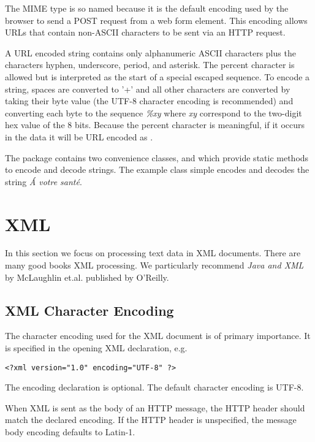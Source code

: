 The MIME type 
is so named because it is the default encoding used by the browser
to send a POST request from a web form element.
This encoding allows URLs that contain non-ASCII characters to be sent via an HTTP request.

A URL encoded string contains only alphanumeric ASCII characters plus the characters
hyphen, underscore, period, and asterisk. 
The percent character is allowed 
but is interpreted as the start of a special escaped sequence.
To encode a string, spaces are converted to '+' and
all other characters are converted by taking their byte value
(the UTF-8 character encoding is recommended)
and converting each byte to the sequence \emph{\%xy} where \emph{xy} correspond to the
two-digit hex value of the 8 bits.
Because the percent character is meaningful,
if it occurs in the data it will be URL encoded as .

The  package contains two convenience classes, 
and  which provide static methods to encode and decode strings.
The example class  simple encodes and decodes the string
\emph{\'{A} votre sant\'{e}}.
%
%
%



\section{XML}

In this section we focus on processing text data in XML documents.
There are many good books XML processing.
We particularly recommend \emph{Java and XML} by McLaughlin et.al.
published by O'Reilly.

\subsection{XML Character Encoding}

The character encoding used for the XML document is of primary importance.
It is specified in the opening XML declaration, e.g.
\begin{verbatim} 
<?xml version="1.0" encoding="UTF-8" ?>
\end{verbatim}  
The encoding declaration is optional.
The default character encoding is UTF-8.

When XML is sent as the body of an HTTP message, the HTTP  
header should match the declared encoding.  If the HTTP  header
is unspecified, the message body encoding defaults to Latin-1.  

